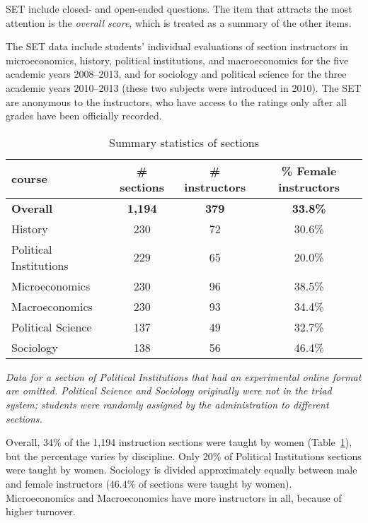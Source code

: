 \documentclass[12pt]{article}
\begin{document}
SET include closed- and open-ended questions.
The item that attracts the most attention is the \emph{overall score}, 
which is treated as a summary of the other items.

The SET data include students' individual evaluations of section
instructors in microeconomics, history, political institutions, and 
macroeconomics for the five academic years 2008--2013, and for 
sociology and political science for the three academic years 2010--2013 
(these two subjects were introduced in 2010). 
The SET are anonymous to the instructors, who have access to the ratings only after 
all grades have been officially recorded.  

\begin{table}[htbp]
  \centering
  \footnotesize 
  \caption{Summary statistics of sections}
    \begin{tabular}{lccc}
    \toprule 
    course     & \# sections & \# instructors  & \% Female instructors  \\
   \midrule
  \textbf{Overall} &  \textbf{1,194} & \textbf{379}  &\textbf{33.8\%} \\
    History    &               230 &      72          &   30.6\% \\
    Political Institutions  &  229 &      65          &   20.0\% \\    
    Microeconomics   &         230 &      96          &   38.5\% \\
    Macroeconomics   &         230 &      93          &   34.4\% \\
    Political Science &       137 &      49          &   32.7\% \\
    Sociology   &              138 &      56          &   46.4\%    \\
    \bottomrule
    \end{tabular}%
 \label{tab:description}%
 
\textit{Data for a section of Political Institutions that 
had an experimental online format are omitted.
Political Science and Sociology originally were not in the triad system; 
students were randomly assigned by the administration to different sections.
} 

\end{table}%
\normalsize
Overall, 34\% of the 1,194 instruction sections were taught by women 
(Table~\ref{tab:description}), but the percentage varies by discipline. 
Only 20\% of Political Institutions sections were taught by women. 
Sociology is divided approximately equally between male and female instructors 
(46.4\% of sections were taught by women). 
Microeconomics and Macroeconomics have more instructors in all, because of higher turnover.
\end{document}

